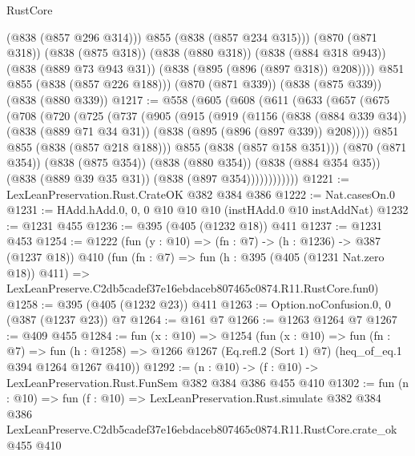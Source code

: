 \begin{lexlean}{RustCore}
\begin{coremodule}
              (@838 (@857 @296 @314)))
            @855
            (@838 (@857 @234 @315)))
          (@870 (@871 @318))
          (@838 (@875 @318))
          (@838 (@880 @318))
          (@838 (@884 @318 @943))
          (@838 (@889 @73 @943 @31))
          (@838 (@895 (@896 (@897 @318)) @208))))
      @851
      @855
      (@838 (@857 @226 @188)))
    (@870 (@871 @339))
    (@838 (@875 @339))
    (@838 (@880 @339))
@1217 := @558
    (@605
      (@608
        (@611
          (@633
            (@657
              (@675
                (@708
                  (@720
                    (@725
                      (@737
                        (@905
                          (@915
                            (@919
                              (@1156
                                (@838 (@884 @339 @34))
                                (@838 (@889 @71 @34 @31))
                                (@838 (@895 (@896 (@897 @339)) @208))))
                            @851
                            @855
                            (@838 (@857 @218 @188)))
                          @855
                          (@838 (@857 @158 @351)))
                        (@870 (@871 @354))
                        (@838 (@875 @354))
                        (@838 (@880 @354))
                        (@838 (@884 @354 @35))
                        (@838 (@889 @39 @35 @31))
                        (@838 (@897 @354))))))))))))
@1221 := LexLeanPreservation.Rust.CrateOK @382 @384 @386
@1222 := Nat.casesOn.{0}
@1231 := HAdd.hAdd.{0, 0, 0} @10 @10 @10 (instHAdd.{0} @10 instAddNat)
@1232 := @1231 @455
@1236 := @395 (@405 (@1232 @18)) @411
@1237 := @1231 @453
@1254 := @1222
    (fun (y : @10) => (fn : @7) -> (h : @1236) -> @387 (@1237 @18))
    @410
    (fun (fn : @7) =>
    fun (h : @395 (@405 (@1231 Nat.zero @18)) @411) =>
    LexLeanPreserve.C2db5cadef37e16ebdaceb807465c0874.R11.RustCore.fun0)
@1258 := @395 (@405 (@1232 @23)) @411
@1263 := Option.noConfusion.{0, 0} (@387 (@1237 @23)) @7
@1264 := @161 @7
@1266 := @1263 @1264 @7
@1267 := @409 @455
@1284 := fun (x : @10) =>
  @1254
    (fun (x : @10) =>
    fun (fn : @7) =>
    fun (h : @1258) => @1266 @1267 (Eq.refl.{2} (Sort 1) @7) (heq_of_eq.{1} @394 @1264 @1267 @410))
@1292 := (n : @10) -> (f : @10) -> LexLeanPreservation.Rust.FunSem @382 @384 @386 @455 @410
@1302 := fun (n : @10) =>
  fun (f : @10) =>
  LexLeanPreservation.Rust.simulate
    @382
    @384
    @386
    LexLeanPreserve.C2db5cadef37e16ebdaceb807465c0874.R11.RustCore.crate_ok
    @455
    @410
\end{coremodule}
\end{lexlean}
